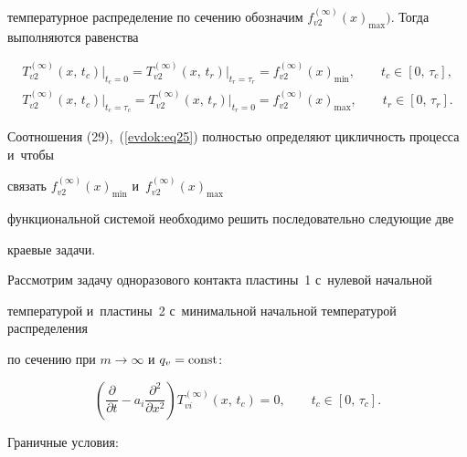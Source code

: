 температурное распределение по сечению обозначим $f_{v2}^{(\infty )} 

(x)_{\max } )$. Тогда выполняются равенства

\begin{gather}

T_{v2}^{(\infty )} (x,\,t_c ) \Big|_{t_c = 0} = 

T_{v2}^{(\infty )} (x,\,t_r ) \Big|_{t_r = \tau _r } = 

f_{v2}^{(\infty )} (x)_{\min } ,\qquad t_c \in [0,\,\tau _c ],\\

\label{evdok:eq25}

T_{v2}^{(\infty )} (x,\,t_c ) \Big|_{t_c = \tau _c } = 

T_{v2}^{(\infty )} (x,\,t_r ) \Big|_{t_r = 0} = 

f_{v2}^{(\infty )} (x)_{\max } ,\qquad t_r \in [0,\,\tau _r ].

\end{gather}

Соотношения (29),\, (\ref{evdok:eq25}) полностью определяют цикличность процесса и~чтобы 

связать $f_{v2}^{(\infty )} (x)_{\min } $ и~$f_{v2}^{(\infty )} (x)_{\max } $ 

функциональной системой необходимо решить последовательно следующие две 

краевые задачи. 



Рассмотрим задачу одноразового контакта пластины~1 с~нулевой начальной 

температурой и~пластины~2 с~минимальной начальной температурой распределения 

по сечению при $m \to \infty $ и $q_v = \rm const$:

\begin{equation}

\label{evdok:eq26}

\left( {\frac{\partial }{\partial t} - a_i \frac{\partial ^2}{\partial x^2}} 

\right)T_{vi}^{(\infty )} (x,\,t_c ) = 0,\qquad t_c \in [0,\,\tau _c ].

\end{equation}



Граничные условия:

